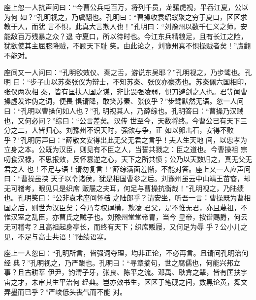 座上忽一人抗声问曰：“今曹公兵屯百万，将列千员，龙骧虎视，平吞江夏，公以为何
如？”孔明视之，乃虞翻也。孔明曰：“曹操收袁绍蚁聚之穷于夏口，区区求教于人，而犹
言不惧，此真大言欺人也！”孔明曰：“刘豫州以数千仁义之师，安能敌百万残暴之众？退
守夏口，所以待时也。今江东兵精粮足，且有长江之险，犹欲使其主屈膝降贼，不顾天下耻
笑。由此论之，刘豫州真不惧操贼者矣！”虞翻不能对。

座间又一人问曰：“孔明欲效仪、秦之舌，游说东吴耶？”孔明视之，乃步骘也。孔明
曰：“步子山以苏秦张仪为辩士，不知苏秦、张仪亦豪杰也。苏秦佩六国相印，张仪两次相
秦，皆有匡扶人国之谋，非比畏强凌弱，惧刀避剑之人也。君等闻曹操虚发诈伪之词，便畏
惧请降，敢笑苏秦、张仪乎？”步骘默然无语。忽一人问曰：“孔明以曹操何如人也？”孔
明视其人，乃薛综也。孔明答曰：“曹操乃汉贼也，又何必问？”综曰：“公言差矣。汉传
世至今，天数将终。今曹公已有天下三分之二，人皆归心。刘豫州不识天时，强欲与争，正
如以卵击石，安得不败乎？”孔明厉声曰：“薛敬文安得出此无父无君之言乎！夫人生天地
间，以忠孝为立身之本。公既为汉臣，则见有不臣之人，当誓共戮之：臣之道也。今曹操祖
宗叨食汉禄，不思报效，反怀篡逆之心，天下之所共愤；公乃以天数归之，真无父无君之人
也！不足与语！请勿复言！”薛综满面羞惭，不能对答。座上又一人应声问曰：“曹操虽挟
天子以令诸侯，犹是相国曹参之后。刘豫州虽云中山靖王苗裔，却无可稽考，眼见只是织席
贩屦之夫耳，何足与曹操抗衡哉！”孔明视之，乃陆绩也。孔明笑曰：“公非袁术座间怀桔
之陆郎乎？请安坐，听吾一言：曹操既为曹相国之后，则世为汉臣矣；今乃专权肆横，欺凌
君父，是不惟无君，亦且蔑祖，不惟汉室之乱臣，亦曹氏之贼子也。刘豫州堂堂帝胄，当今
皇帝，按谱赐爵，何云无可稽考？且高祖起身亭长，而终有天下；织席贩屦，又何足为辱
乎？公小儿之见，不足与高士共语！”陆绩语塞。

座上一人忽曰：“孔明所言，皆强词夺理，均非正论，不必再言。且请问孔明治何经
典？”孔明视之，乃严酸也。孔明曰：“寻章摘句，世之腐儒也，何能兴邦立事？且古耕莘
伊尹，钓渭子牙，张良、陈平之流。邓禹、耿弇之辈，皆有匡扶宇宙之才，未审其生平治何
经典。岂亦效书生，区区于笔砚之间，数黑论黄，舞文弄墨而已乎？”严峻低头丧气而不能
对。

